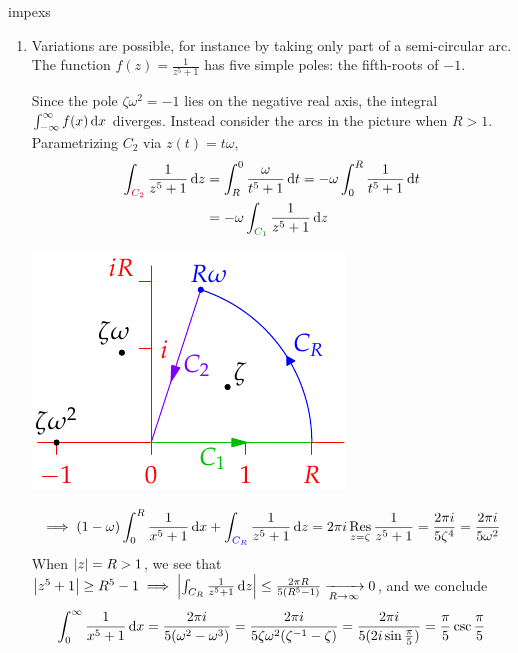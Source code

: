 \begin{examples}{}{impexs}
\begin{enumerate}
  \item\label{ex:smallarc} Variations are possible, for instance by taking only part of a semi-circular arc. The function $f(z)=\frac 1{z^5+1}$ has five simple poles: the fifth-roots of $-1$.\par
 	\begin{minipage}[t]{0.65\linewidth}\vspace{-10pt}
Since the pole $\zeta\omega^2=-1$ lies on the negative real axis, the integral $\int_{-\infty}^\infty f(x)\,{\mathrm{d} x}$ diverges. Instead consider the arcs in the picture when $R>1$. Parametrizing $C_2$ via $z(t)=t\omega$,
\begin{align*}
\int_{\textcolor{purple}{C_2}}\frac 1{z^5+1}\,\dz&= \int_R^0\frac{\omega}{t^5+1}\,\dt=-\omega\int_0^R\frac{1}{t^5+1}\,\dt\\
&=-\omega\int_{\textcolor{Green}{C_1}}\frac 1{z^5+1}\,\dz
\end{align*}
\end{minipage}\begin{minipage}[t]{0.35\linewidth}\vspace{-25pt}
\flushright\includegraphics{integral4}
\end{minipage}\par\vspace{-5pt}
\[\implies(1-\omega)\int_0^R\frac 1{x^5+1}\,{\mathrm{d} x}+\int_{\textcolor{blue}{C_R}}\frac 1{z^5+1}\,{\mathrm{d} z}=2\pi i\operatorname*{Res}_{z=\zeta}\frac 1{z^5+1} =\frac{2\pi i}{5\zeta^4}=\frac{2\pi i}{5\omega^2}\]
When $\left| z\right|=R>1$, we see that $\left| z^5+1\right|\ge R^5-1\implies\left| \int_{C_R}\frac 1{z^5+1}\,{\mathrm{d} z}\right|\le\frac{2\pi R}{5(R^5-1)}\xrightarrow[R\to\infty]{}0$, and we conclude
\[\int_0^\infty\frac 1{x^5+1}\,{\mathrm{d} x}=\frac{2\pi i}{5(\omega^2-\omega^3)} =\frac{2\pi i}{5\zeta\omega^2(\zeta^{-1}-\zeta)} =\frac{2\pi i}{5(2i\sin\frac\pi 5)}=\frac \pi 5\csc\frac\pi 5\]
\end{enumerate}
\end{examples}



